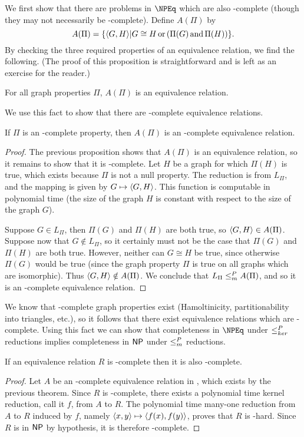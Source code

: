 We first show that there are problems in $\NPEq$ which are also \NP-complete (though they may not necessarily be \NPEq-complete).
Define $A(\Pi)$ by
\begin{displaymath}
  A(\Pi) = \{\langle G,H\rangle | G\cong H \,\text{or}\, (\Pi(G) \,\text{and}\, \Pi(H))\}.
\end{displaymath}
By checking the three required properties of an equivalence relation, we find the following.
(The proof of this proposition is straightforward and is left as an exercise for the reader.)
\begin{proposition}
  For all graph properties $\Pi$, $A(\Pi)$ is an equivalence relation.
\end{proposition}
We use this fact to show that there are \NP-complete equivalence relations.
\begin{proposition}\label{prop:APi}
  If $\Pi$ is an \NP-complete property, then $A(\Pi)$ is an \NP-complete equivalence relation.
\end{proposition}
\begin{proof}
  The previous proposition shows that $A(\Pi)$ is an equivalence relation, so it remains to show that it is \NP-complete.
  Let $H$ be a graph for which $\Pi(H)$ is true, which exists because $\Pi$ is not a null property.
  The reduction is from $L_\Pi$, and the mapping is given by $G\mapsto\langle G,H\rangle$.
  This function is computable in polynomial time (the size of the graph $H$ is constant with respect to the size of the graph $G$).

  Suppose $G\in L_\Pi$, then $\Pi(G)$ and $\Pi(H)$ are both true, so $\langle G,H\rangle\in A(\Pi)$.
  Suppose now that $G\notin L_\Pi$, so it certainly must not be the case that $\Pi(G)$ and $\Pi(H)$ are both true.
  However, neither can $G\cong H$ be true, since otherwise $\Pi(G)$ would be true (since the graph property $\Pi$ is true on all graphs which are isomorphic).
  Thus $\langle G,H\rangle\notin A(\Pi)$.
  We conclude that $L_\Pi\leq^{P}_{m} A(\Pi)$, and so it is an \NP-complete equivalence relation.
\end{proof}

We know that \NP-complete graph properties exist (Hamoltinicity, partitionability into triangles, etc.), so it follows that there exist equivalence relations which are \NP-complete.
Using this fact we can show that completeness in $\NPEq$ under $\leq^{P}_{ker}$ reductions implies completeness in ${\mathsf{NP}}$ under $\leq^{P}_{m}$ reductions.

\begin{corollary}
  If an equivalence relation $R$ is \NPEq-complete then it is also \NP-complete.
\end{corollary}
\begin{proof}
  Let $A$ be an \NP-complete equivalence relation in \NPEq, which exists by the previous theorem.
  Since $R$ is \NPEq-complete, there exists a polynomial time kernel reduction, call it $f$, from $A$ to $R$.
  The polynomial time many-one reduction from $A$ to $R$ induced by $f$, namely $\langle x,y\rangle\mapsto\langle f(x),f(y)\rangle$, proves that $R$ is \NP-hard.
  Since $R$ is in ${\mathsf{NP}}$ by hypothesis, it is therefore \NP-complete.
\end{proof}

